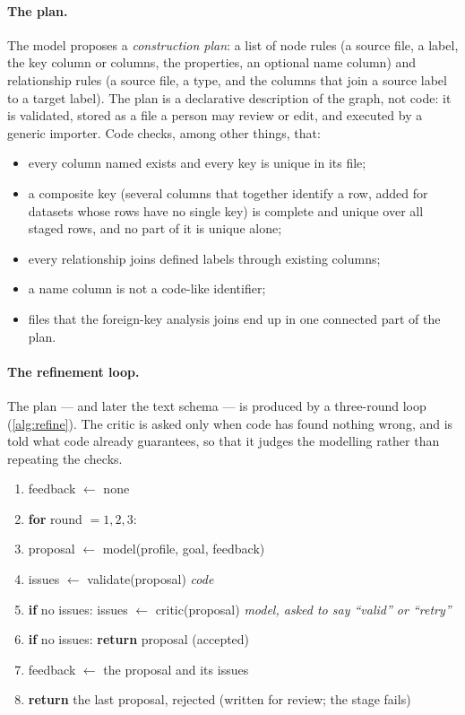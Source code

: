 \paragraph{The plan.} The model proposes a \emph{construction plan}: a list of node rules (a source file, a
label, the key column or columns, the properties, an optional name column) and relationship rules (a source file,
a type, and the columns that join a source label to a target label). The plan is a declarative description of
the graph, not code: it is validated, stored as a file a person may review or edit, and executed by a generic
importer. Code checks, among other things, that:
\begin{itemize}[nosep]
\item every column named exists and every key is unique in its file;
\item a composite key (several columns that together identify a row, added for datasets whose rows have no
single key) is complete and unique over all staged rows, and no part of it is unique alone;
\item every relationship joins defined labels through existing columns;
\item a name column is not a code-like identifier;
\item files that the foreign-key analysis joins end up in one connected part of the plan.
\end{itemize}

\paragraph{The refinement loop.} The plan --- and later the text schema --- is produced by a three-round loop
(\cref{alg:refine}). The critic is asked only when code has found nothing wrong, and is told what code already
guarantees, so that it judges the modelling rather than repeating the checks.

\begin{algorithm}[htbp]
\caption{Propose, validate, critique (\texttt{llm/refine.py}).}\label{alg:refine}
\small
\begin{enumerate}[nosep,label=\arabic*.]
\item feedback $\gets$ none
\item \textbf{for} round $= 1, 2, 3$:
\item \quad proposal $\gets$ model(profile, goal, feedback)
\item \quad issues $\gets$ validate(proposal) \hfill \emph{code}
\item \quad \textbf{if} no issues: issues $\gets$ critic(proposal) \hfill \emph{model, asked to say ``valid'' or ``retry''}
\item \quad \textbf{if} no issues: \textbf{return} proposal (accepted)
\item \quad feedback $\gets$ the proposal and its issues
\item \textbf{return} the last proposal, rejected (written for review; the stage fails)
\end{enumerate}
\end{algorithm}

